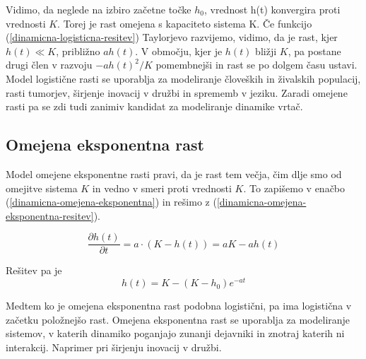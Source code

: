 \documentclass[a4paper, twoside, 12pt]{book}
\begin{document}
          Vidimo, da neglede na izbiro začetne točke $h_0$, vrednost h(t) konvergira proti vrednosti $K$. Torej je rast omejena s kapaciteto sistema K.
          Če funkcijo (\ref{dinamicna-logisticna-resitev}) Taylorjevo razvijemo, vidimo, da je rast, kjer $h(t) \ll K$, približno $a h(t)$. V območju, kjer je $h(t)$ bližji $K$, pa postane drugi člen v razvoju $-a h(t)^2 / K$ pomembnejši in rast se po dolgem času ustavi.
          Model logistične rasti se uporablja za modeliranje človeških in živalskih populacij, rasti tumorjev, širjenje inovacij v družbi in sprememb v jeziku. Zaradi omejene rasti pa se zdi tudi zanimiv kandidat za modeliranje dinamike vrtač.


          \subsection{Omejena eksponentna rast}

          Model omejene eksponentne rasti pravi, da je rast tem večja, čim dlje smo od omejitve sistema $K$ in vedno v smeri proti vrednosti $K$. To zapišemo v enačbo (\ref{dinamicna-omejena-eksponentna}) in rešimo z (\ref{dinamicna-omejena-eksponentna-resitev}).

          \begin{equation}
            \frac{\partial h(t)}{\partial t} = a \cdot ( K - h(t) ) = a K - a h(t)
            \label{dinamicna-omejena-eksponentna}
          \end{equation}

          Rešitev pa je
          \begin{equation}
            h(t) = K - (K - h_0) e^{-a t}
            \label{dinamicna-omejena-eksponentna-resitev}
          \end{equation}

            Medtem ko je omejena eksponentna rast podobna logistični, pa ima logistična v začetku položnejšo rast. Omejena eksponentna rast se uporablja za modeliranje sistemov, v katerih dinamiko poganjajo zunanji dejavniki in znotraj katerih ni interakcij. Naprimer pri širjenju inovacij v družbi.
\end{document}
